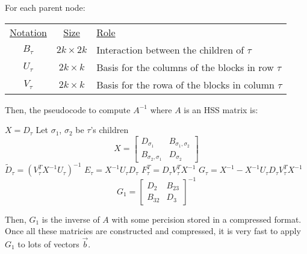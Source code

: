 For each parent node:

\begin{tabular}{ccl}
    \underline{Notation} & \underline{Size} &
    \underline{Role}\\
    $B_{\tau}$ & $2k \times 2k$ & Interaction between the children of $\tau$\\
    $U_{\tau}$ & $2k \times k$ & Basis for the columns of the blocks in row $\tau$\\
    $V_{\tau}$ & $2k \times k$ & Basis for the rowa of the blocks in column $\tau$\\
\end{tabular}


Then, the pseudocode to compute $A^{-1}$ where $A$ is an HSS matrix is:
\begin{algorithm}[H]
    \begin{algorithmic}
                \STATE $X=D_{\tau}$
            \ELSE
                \STATE Let $\sigma_1$, $\sigma_2$ be $\tau$'s children
                \STATE \begin{equation*}
                    X = \begin{bmatrix}
                        D_{\sigma_1}  & B_{\sigma_1, \sigma_2} \\
                        B_{\sigma_2, \sigma_1} & D_{\sigma_2}
                \end{bmatrix}
            \end{equation*}
            \ENDIF
            \STATE $\widetilde{D}_{\tau} = \left( V^T_{\tau}X^{-1} U_{\tau}\right)^{-1}$
            \STATE $E_{\tau} = X^{-1}  U_{\tau} D_{\tau}$
            \STATE $F^T_{\tau} = D_{\tau} V^T_{\tau}X^{-1}$
            \STATE $G_{\tau} = X^{-1} - X^{-1}U_{\tau}D_{\tau} V^T_{\tau}X^{-1}$
        \ENDFOR
    \ENDFOR
    \STATE  \begin{equation*}
        G_1 =
        \begin{bmatrix}
            D_2 & B_{23}\\
            B_{32} & D_3
        \end{bmatrix}^{-1}
\end{equation*}
      \end{algorithmic}
  \end{algorithm}

Then, $G_1$ is the inverse of $A$ with some percision stored in a compressed format. Once all these matricies are constructed and compressed, it is very fast to apply $G_1$ to lots of vectors $\vec{b}$.

